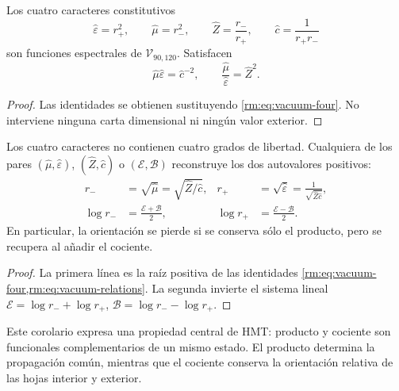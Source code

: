 \begin{theorem}
Los cuatro caracteres constitutivos
\begin{equation}
\widehat\varepsilon=r_+^2,\qquad
\widehat\mu=r_-^2,\qquad
\widehat Z=\frac{r_-}{r_+},\qquad
\widehat c=\frac1{r_+r_-}
\label{rm:eq:vacuum-four}
\end{equation}
son funciones espectrales de \(\mathcal V_{90,120}\). Satisfacen
\begin{equation}
\widehat\mu\widehat\varepsilon=\widehat c^{-2},
\qquad
\frac{\widehat\mu}{\widehat\varepsilon}=\widehat Z^2.
\label{rm:eq:vacuum-relations}
\end{equation}
\end{theorem}

\begin{proof}
Las identidades se obtienen sustituyendo \cref{rm:eq:vacuum-four}. No interviene ninguna carta dimensional ni ning\'un valor exterior.
\end{proof}

\begin{corollary}
Los cuatro caracteres no contienen cuatro grados de libertad. Cualquiera de
los pares \((\widehat\mu,\widehat\varepsilon)\),
\((\widehat Z,\widehat c)\) o \((\mathcal E,\mathcal B)\) reconstruye los
dos autovalores positivos:
\begin{align}
r_-&=\sqrt{\widehat\mu}
=\sqrt{\widehat Z/\widehat c},
&r_+&=\sqrt{\widehat\varepsilon}
=\frac1{\sqrt{\widehat Z\widehat c}},
\label{rm:eq:vacuum-reconstruct-r}\\
\log r_-&=\frac{\mathcal E+\mathcal B}{2},
&\log r_+&=\frac{\mathcal E-\mathcal B}{2}.
\label{rm:eq:vacuum-reconstruct-log}
\end{align}
En particular, la orientaci\'on se pierde si se conserva s\'olo el producto,
pero se recupera al a\~nadir el cociente.
\end{corollary}

\begin{proof}
La primera l\'inea es la ra\'iz positiva de las identidades
\cref{rm:eq:vacuum-four,rm:eq:vacuum-relations}. La segunda invierte el sistema
lineal
\(\mathcal E=\log r_-+\log r_+\),
\(\mathcal B=\log r_--\log r_+\).
\end{proof}

Este corolario expresa una propiedad central de HMT: producto y cociente son
funcionales complementarios de un mismo estado. El producto determina la
propagaci\'on com\'un, mientras que el cociente conserva la orientaci\'on
relativa de las hojas interior y exterior.

